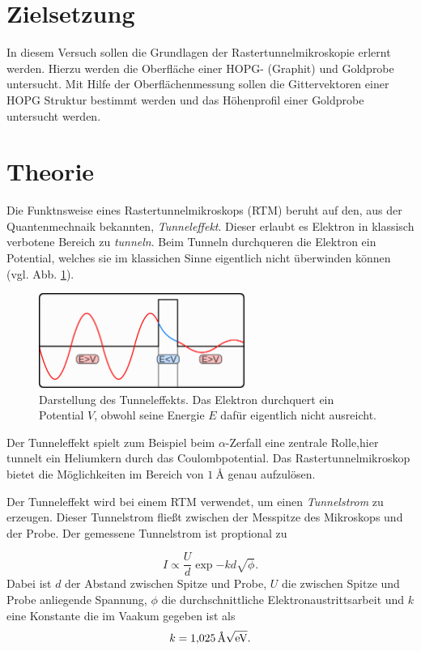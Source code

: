 \setcounter{page}{1}
\section*{Zielsetzung}
In diesem Versuch sollen die Grundlagen der Rastertunnelmikroskopie
erlernt werden.
Hierzu werden die Oberfläche einer HOPG- (Graphit) und
Goldprobe untersucht. Mit Hilfe der Oberflächenmessung sollen die Gittervektoren
einer HOPG Struktur bestimmt werden und das Höhenprofil einer Goldprobe untersucht werden.

\section{Theorie}
Die Funktnsweise eines  Rastertunnelmikroskops (RTM) beruht auf den, aus der Quantenmechnaik bekannten,
\emph{Tunneleffekt}. Dieser erlaubt es Elektron in klassisch verbotene Bereich zu \emph{tunneln}.
Beim Tunneln durchqueren die Elektron ein Potential, welches sie im klassichen Sinne
eigentlich nicht überwinden können (vgl. Abb. \ref{fig: tunneleffekt}).
\begin{figure}[!h]
  \centering
  \includegraphics[width=0.6\textwidth]{./pics/tunelleffekt.png}
  \caption{Darstellung des Tunneleffekts.
  Das Elektron durchquert ein Potential $V$, obwohl seine Energie $E$ dafür eigentlich nicht ausreicht. \cite{tunnel}}
  \label{fig: tunneleffekt}
\end{figure}
Der Tunneleffekt spielt zum Beispiel beim $\alpha$-Zerfall eine zentrale Rolle,hier tunnelt ein Heliumkern durch das Coulombpotential.
Das Rastertunnelmikroskop bietet die Möglichkeiten im Bereich von $\SI{1}{\angstrom}$ genau aufzulösen.

Der Tunneleffekt wird bei einem RTM verwendet, um einen \emph{Tunnelstrom} zu erzeugen. Dieser Tunnelstrom
fließt zwischen der Messpitze des Mikroskops und der Probe.
Der gemessene Tunnelstrom ist proptional zu

\begin{equation}
  \label{eq: tunnelstrom}
I\propto \frac{U}{d}\exp{-kd\sqrt{\phi}}.
\end{equation}
Dabei ist $d$ der Abstand zwischen Spitze und Probe, $U$ die zwischen Spitze und Probe anliegende Spannung,
$\phi$ die durchschnittliche Elektronaustrittsarbeit und $k$ eine Konstante die im Vaakum gegeben ist als
\begin{equation*}
  k=\SI{1.025}{\per\angstrom\sqrt{\eV}}.
\end{equation*}

